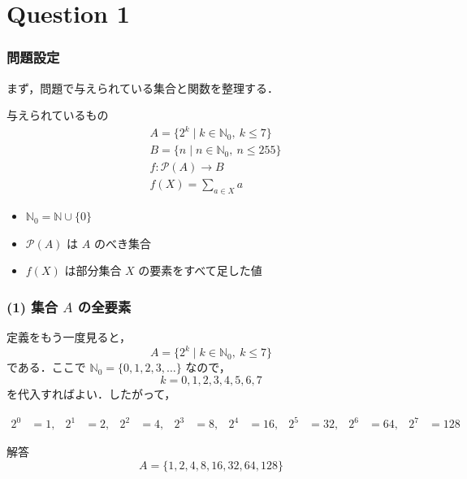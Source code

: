 \section{Question 1}
\begin{frame}
    \frametitle{問題設定}
    まず，問題で与えられている集合と関数を整理する．

    \begin{block}{与えられているもの}
        \begin{align*}
            &A = \{2^k \mid k \in \mathbb{N}_0,\ k \le 7\}\\
            &B = \{n \mid n \in \mathbb{N}_0,\ n \le 255\}\\
            &f : \mathcal{P}(A) \to B\\
            &f(X) = \sum_{a \in X} a
        \end{align*}
    \end{block}

    \begin{itemize}
        \item \(\mathbb{N}_0=\mathbb{N}\cup\{0\}\)
        \item \(\mathcal{P}(A)\) は \(A\) のべき集合
        \item \(f(X)\) は部分集合 \(X\) の要素をすべて足した値
    \end{itemize}
\end{frame}

\begin{frame}
    \frametitle{(1) 集合 \(A\) の全要素}
    定義をもう一度見ると，
    \[
        A=\{2^k \mid k \in \mathbb{N}_0,\ k \le 7\}
    \]
    である．ここで \(\mathbb{N}_0=\{0,1,2,3,\dots\}\) なので，
    \[
        k=0,1,2,3,4,5,6,7
    \]
    を代入すればよい．したがって，

    \pause

    \begin{align*}
        2^0 &= 1, &
        2^1 &= 2, &
        2^2 &= 4, &
        2^3 &= 8,  &
        2^4 &= 16, &
        2^5 &= 32, &
        2^6 &= 64, &
        2^7 &= 128
    \end{align*}

    \pause

    \begin{alertblock}{解答}
        \[
            A=\{1,2,4,8,16,32,64,128\}
        \]
    \end{alertblock}
\end{frame}


